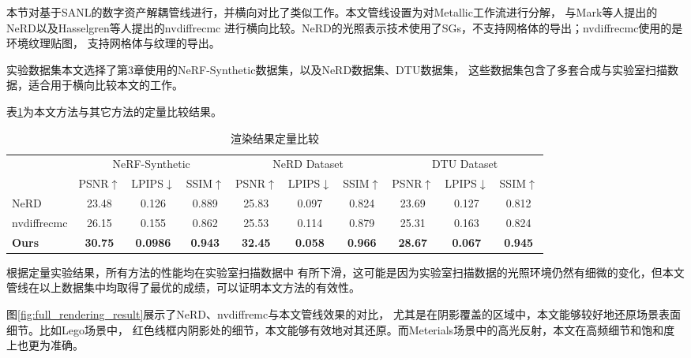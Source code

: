 本节对基于SANL的数字资产解耦管线进行，并横向对比了类似工作。本文管线设置为对Metallic工作流进行分解，
与Mark等人\cite{Boss_2021}提出的NeRD以及Hasselgren等人\cite{10.5555/3600270.3601931}提出的nvdiffrecmc
进行横向比较。NeRD的光照表示技术使用了SGs，不支持网格体的导出；nvdiffrecmc使用的是环境纹理贴图，
支持网格体与纹理的导出。

实验数据集本文选择了第3章使用的NeRF-Synthetic数据集，以及NeRD数据集、DTU数据集\cite{jensen2014large}，
这些数据集包含了多套合成与实验室扫描数据，适合用于横向比较本文的工作。

表\ref{tab:dataset_comparison}为本文方法与其它方法的定量比较结果。
\begin{table}[h]
  \centering
  \caption{渲染结果定量比较}
  \begin{tabular}{l ccc ccc ccc}
      \toprule
      & \multicolumn{3}{c}{NeRF-Synthetic} & \multicolumn{3}{c}{NeRD Dataset} & \multicolumn{3}{c}{DTU Dataset} \\
      \cmidrule(lr){2-4} \cmidrule(lr){5-7} \cmidrule(lr){8-10}
      & PSNR$\uparrow$ & LPIPS$\downarrow$ & SSIM$\uparrow$ & PSNR$\uparrow$ & LPIPS$\downarrow$ & SSIM$\uparrow$ & PSNR$\uparrow$ & LPIPS$\downarrow$ & SSIM$\uparrow$ \\
      \midrule
      NeRD & 23.48 & 0.126 & 0.889 & 25.83 & 0.097 & 0.824 & 23.69 & 0.127 & 0.812 \\
      nvdiffrecmc & 26.15 & 0.155 & 0.862 & 25.53 & 0.114 & 0.879 & 25.31 & 0.163 & 0.824 \\
      \textbf{Ours} & \textbf{30.75} & \textbf{0.0986} & \textbf{0.943} & \textbf{32.45} & \textbf{0.058} & \textbf{0.966} & \textbf{28.67} & \textbf{0.067} & \textbf{0.945} \\
      \bottomrule
  \end{tabular}
  \label{tab:dataset_comparison}
\end{table}

根据定量实验结果，所有方法的性能均在实验室扫描数据中
有所下滑，这可能是因为实验室扫描数据的光照环境仍然有细微的变化，但本文管线在以上数据集中均取得了最优的成绩，可以证明本文方法的有效性。

图\ref{fig:full_rendering_result}展示了NeRD、nvdiffremc与本文管线效果的对比，
尤其是在阴影覆盖的区域中，本文能够较好地还原场景表面细节。比如Lego场景中，
红色线框内阴影处的细节，本文能够有效地对其还原。而Meterials场景中的高光反射，本文在高频细节和饱和度上也更为准确。

